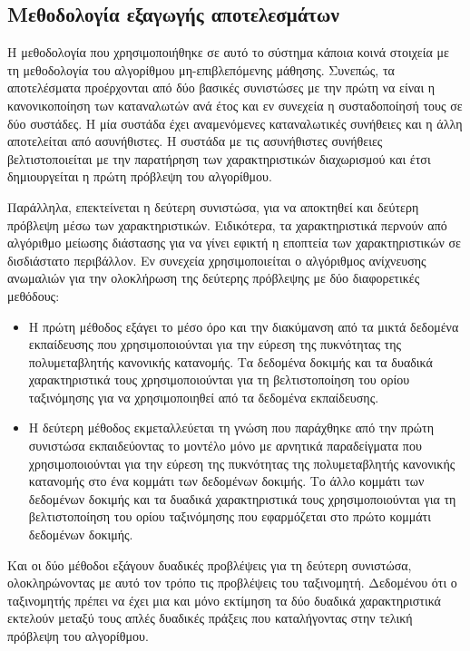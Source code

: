 \subsection{Μεθοδολογία εξαγωγής αποτελεσμάτων}
Η μεθοδολογία που χρησιμοποιήθηκε σε αυτό το σύστημα κάποια κοινά στοιχεία με τη μεθοδολογία του αλγορίθμου μη-επιβλεπόμενης μάθησης. Συνεπώς, τα αποτελέσματα προέρχονται από δύο βασικές συνιστώσες με την πρώτη να είναι η κανονικοποίηση των καταναλωτών ανά έτος και εν συνεχεία η συσταδοποίησή τους σε δύο συστάδες. Η μία συστάδα έχει αναμενόμενες καταναλωτικές συνήθειες και η άλλη αποτελείται από ασυνήθιστες. H συστάδα με τις ασυνήθιστες συνήθειες βελτιστοποιείται με την παρατήρηση των χαρακτηριστικών διαχωρισμού και έτσι δημιουργείται η πρώτη πρόβλεψη του αλγορίθμου.\par
Παράλληλα, επεκτείνεται η δεύτερη συνιστώσα, για να αποκτηθεί και δεύτερη πρόβλεψη μέσω των χαρακτηριστικών. Ειδικότερα, τα χαρακτηριστικά περνούν από αλγόριθμο μείωσης διάστασης για να γίνει εφικτή η εποπτεία των χαρακτηριστικών σε δισδιάστατο περιβάλλον. Εν συνεχεία χρησιμοποιείται ο αλγόριθμος ανίχνευσης ανωμαλιών για την ολοκλήρωση της δεύτερης πρόβλεψης με δύο διαφορετικές μεθόδους:
\begin{itemize}
\item Η πρώτη μέθοδος εξάγει το μέσο όρο και την διακύμανση από τα μικτά δεδομένα εκπαίδευσης που χρησιμοποιούνται για την εύρεση της πυκνότητας της πολυμεταβλητής κανονικής κατανομής. Τα δεδομένα δοκιμής και τα δυαδικά χαρακτηριστικά τους χρησιμοποιούνται για τη βελτιστοποίηση του ορίου ταξινόμησης για να χρησιμοποιηθεί από τα δεδομένα εκπαίδευσης.
\item Η δεύτερη μέθοδος εκμεταλλεύεται τη γνώση που παράχθηκε από την πρώτη συνιστώσα εκπαιδεύοντας το μοντέλο μόνο με αρνητικά παραδείγματα που χρησιμοποιούνται για την εύρεση της πυκνότητας της πολυμεταβλητής κανονικής κατανομής στο ένα κομμάτι των δεδομένων δοκιμής. Το άλλο κομμάτι των δεδομένων δοκιμής και τα δυαδικά χαρακτηριστικά τους χρησιμοποιούνται για τη βελτιστοποίηση του ορίου ταξινόμησης που εφαρμόζεται στο πρώτο κομμάτι δεδομένων δοκιμής.
\end{itemize}
\par Και οι δύο μέθοδοι εξάγουν δυαδικές προβλέψεις για τη δεύτερη συνιστώσα, ολοκληρώνοντας με αυτό τον τρόπο τις προβλέψεις του ταξινομητή. Δεδομένου ότι ο ταξινομητής πρέπει να έχει μια και μόνο εκτίμηση τα δύο δυαδικά χαρακτηριστικά εκτελούν μεταξύ τους απλές δυαδικές πράξεις που καταλήγοντας στην τελική πρόβλεψη του αλγορίθμου.
